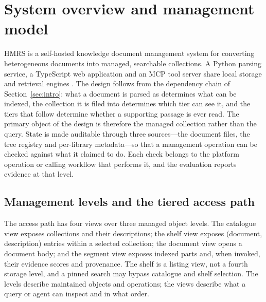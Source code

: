\section{System overview and management model}
\label{sec:system}

HMRS is a self-hosted knowledge document management system for converting
heterogeneous documents into managed, searchable collections. A Python
parsing service, a TypeScript web application and an MCP tool server share
local storage and retrieval engines \cite{mcp}. The design follows from the
dependency chain of Section~\ref{sec:intro}: what a document is parsed as
determines what can be indexed, the collection it is filed into determines
which tier can see it, and the tiers that follow determine whether a
supporting passage is ever read. The primary object of the design is therefore
the managed collection rather than the query. State is made auditable through
three sources---the document files, the tree registry and per-library
metadata---so that a management operation can be checked against what it
claimed to do. Each check belongs to the platform operation or calling
workflow that performs it, and the evaluation reports evidence at that level.

\subsection{Management levels and the tiered access path}
\label{sec:levels}

The access path has four views over three managed object levels. The catalogue
view exposes collections and their descriptions; the shelf view exposes
(document, description) entries within a selected collection; the document view
opens a document body; and the segment view exposes indexed parts and, when
invoked, their evidence scores and provenance. The shelf is a listing view, not
a fourth storage level, and a pinned search may bypass catalogue and shelf
selection. The levels describe maintained objects and operations; the views
describe what a query or agent can inspect and in what order.

